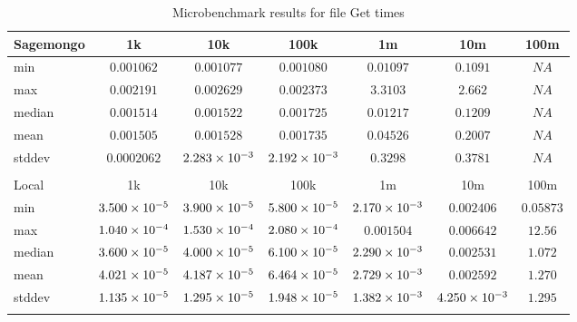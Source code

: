 \begin{table}
{\begin{tabular}[h]{l|c|c|c|c|c|c}
Sagemongo & 1k & 10k & 100k & 1m & 10m & 100m \\
\hline
min & $0.001062$ & $0.001077$ & $0.001080$ & $0.01097$ & $0.1091$ & $NA$ \\
max & $0.002191$ & $0.002629$ & $0.002373$ & $3.3103$ & $2.662$ & $NA$ \\
median & $0.001514$ & $0.001522$ & $0.001725$ & $0.01217$ & $0.1209$ & $NA$ \\
mean & $0.001505$ & $0.001528$ & $0.001735$ & $0.04526$ & $0.2007$ & $NA$ \\
stddev & $0.0002062$ & $2.283\times 10^{-3}$ & $2.192\times 10^{-3}$ & $0.3298$ & $0.3781$ & $NA$ \\
\\

Local & 1k & 10k & 100k & 1m & 10m & 100m \\
\hline
min & $3.500\times 10^{-5}$ & $3.900\times 10^{-5}$ & $5.800\times 10^{-5}$ & $2.170\times 10^{-3}$ & $0.002406$ & $0.05873$ \\
max & $1.040\times 10^{-4}$ & $1.530\times 10^{-4}$ & $2.080\times 10^{-4}$ & $0.001504$ & $0.006642$ & $12.56$ \\
median & $3.600\times 10^{-5}$ & $4.000\times 10^{-5}$ & $6.100\times 10^{-5}$ & $2.290\times 10^{-3}$ & $0.002531$ & $1.072$ \\
mean & $4.021\times 10^{-5}$ & $4.187\times 10^{-5}$ & $6.464\times 10^{-5}$ & $2.729\times 10^{-3}$ & $0.002592$ & $1.270$ \\
stddev & $1.135\times 10^{-5}$ & $1.295\times 10^{-5}$ & $1.948\times 10^{-5}$ & $1.382\times 10^{-3}$ & $4.250\times 10^{-3}$ & $1.295$ \\
\\

\end{tabular}
}
\caption{Microbenchmark results for file Get times}
\end{table}
